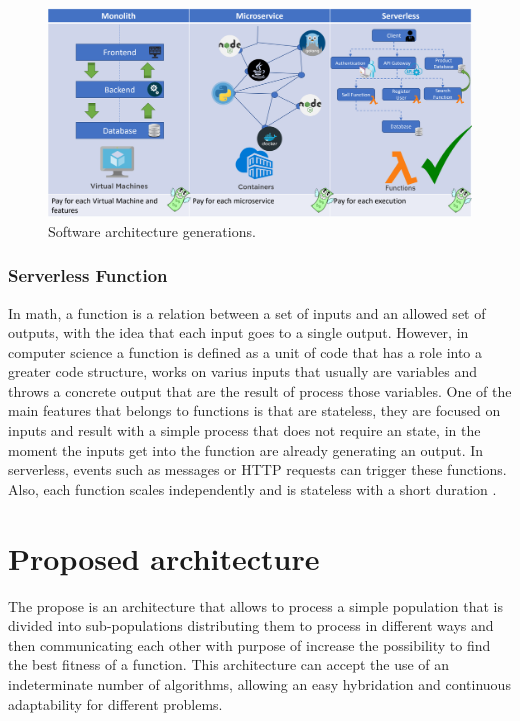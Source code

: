 \documentclass[runningheads]{llncs}
\begin{document}
\begin{figure}[htp]
  \includegraphics[width=\textwidth]{img/architectures.png}
  \caption{Software architecture generations.} \label{fig1}
  \end{figure}

\subsubsection{Serverless Function} 
In math, a function is a relation between a set of inputs and an allowed set of
outputs, with the idea that each input goes to a single output. However, in
computer science a function is defined as a unit of code that has a role into a
greater code structure, works on varius inputs that usually are variables and throws a concrete
output that are the result of process those variables. One of the main features that belongs to
functions is that are stateless, they are focused on inputs and result with a simple process
that does not require an state, in the moment the inputs get into the function are already generating an output.  
In serverless,  events such as messages or HTTP requests can trigger these functions. 
Also, each function scales independently and is stateless with a short duration \cite{Baird2016}.

\section{Proposed architecture}

The propose is an architecture that allows to process a simple population that
is divided into sub-populations distributing them to process in different ways
and then communicating each other with purpose of increase the possibility to
find the best fitness of a function. This architecture can accept the use of an
indeterminate number of algorithms, allowing an easy hybridation and continuous
adaptability for different problems.
\end{document}

